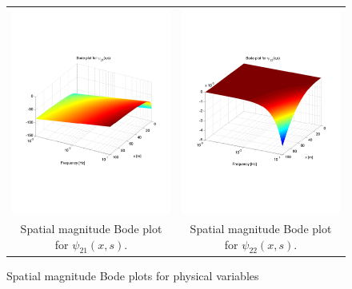 \documentclass[preprint]{elsarticle}
\begin{document}
\begin{figure}
\begin{centering}
\begin{tabular}{cc}
\includegraphics[trim = 0mm 60mm 0mm 60mm, width = 8cm]{distr21_-3to-1}
&
\includegraphics[trim = 0mm 60mm 0mm 60mm, width = 8cm]{distr22_-3to-1}
\tabularnewline
Spatial magnitude Bode plot for $\psi_{21}(x,s)$.
&
Spatial magnitude Bode plot for $\psi_{22}(x,s)$.
\tabularnewline
\end{tabular}
\caption{Spatial magnitude Bode plots for physical variables\label{Magn_spatial_physx}}
\par\end{centering}
\end{figure}
\end{document}
